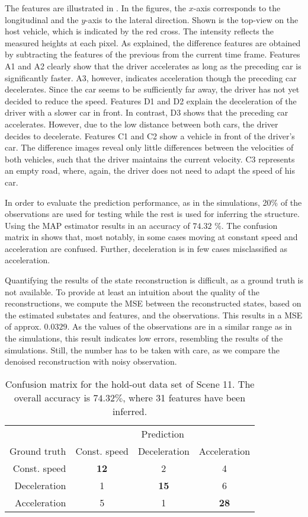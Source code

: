 \documentclass{article}
\begin{document}
The features are illustrated in .
In the figures, the $x$-axis corresponds to the longitudinal and the $y$-axis to the lateral direction.
Shown is the top-view on the host vehicle, which is indicated by the red cross.
The intensity reflects the measured heights at each pixel.
As explained, the difference features are obtained by subtracting the features of the previous from the current time frame. 
Features A1 and A2 clearly show that the driver accelerates as long as the preceding car is significantly faster. A3, however, indicates acceleration though the preceding car decelerates. Since the car seems to be sufficiently far away, the driver has not yet decided to reduce the speed.
Features D1 and D2 explain the deceleration of the driver with a slower car in front. In contrast, D3 shows that the preceding car accelerates. However, due to the low distance between both cars, the driver decides to decelerate.
Features C1 and C2 show a vehicle in front of the driver's car. The difference images reveal only little differences between the velocities of both vehicles, such that the driver maintains the current velocity. C3 represents an empty road, where, again, the driver does not need to adapt the speed of his car.



In order to evaluate the prediction performance, as in the simulations, 20\% of the observations are used for testing while the rest is used for inferring the structure. 
Using the \ac{MAP} estimator results in an accuracy of $74.32$ \%. 
The confusion matrix in  shows that, most notably, in some cases moving at constant speed and acceleration are confused. 
Further, deceleration is in few cases misclassified as acceleration.

Quantifying the results of the state reconstruction is difficult, as a ground truth is not available. 
To provide at least an intuition about the quality of the reconstructions, we compute the \ac{MSE} between the reconstructed states, based on the estimated substates and features, and the observations.
This results in a \ac{MSE} of approx. $0.0329$. 
As the values of the observations are in a similar range as in the simulations, this result indicates low errors, resembling the results of the simulations.
Still, the number has to be taken with care, as we compare the denoised reconstruction with noisy observation. 

\begin{table}
 \centering
 \caption{Confusion matrix for the hold-out data set of Scene 11. The overall accuracy is $74.32\%$, where 31 features have been inferred.}
 \begin{tabular}{r||ccc}
       & \multicolumn{3}{c}{Prediction}
   \\ Ground truth  & Const. speed  & Deceleration & Acceleration
   \\ \hline \hline
      Const. speed & \bf 12 & 2 & 4
   \\ Deceleration & 1  & \bf 15 & 6
   \\ Acceleration & 5  & 1 & \bf 28
 \end{tabular}
 \label{tab::res::real::conf::0011}
\end{table}
\end{document}
